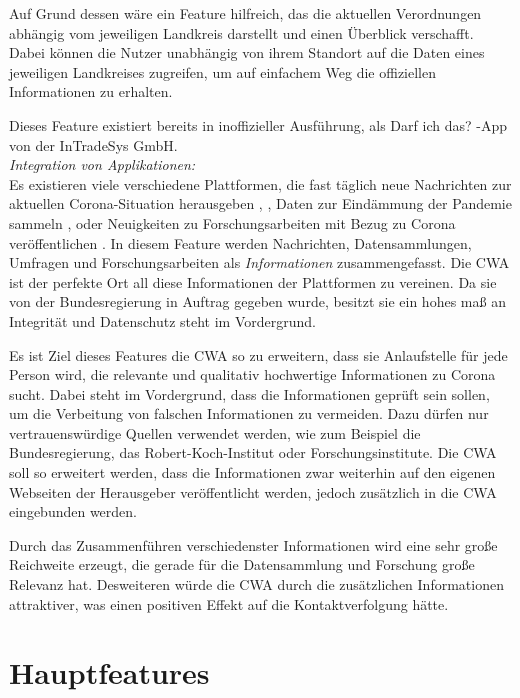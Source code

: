 \documentclass[conference]{IEEEtran}
\begin{document}
Auf Grund dessen wäre ein Feature hilfreich, das die aktuellen Verordnungen abhängig vom jeweiligen Landkreis darstellt und einen Überblick verschafft.
Dabei können die Nutzer unabhängig von ihrem Standort auf die Daten eines jeweiligen Landkreises zugreifen,
um auf einfachem Weg die offiziellen Informationen zu erhalten. 

Dieses Feature existiert bereits in inoffizieller Ausführung, als \glqq Darf ich das? \grqq{} -App von der InTradeSys GmbH. \cite{DarfIchDas}\\

\textit{Integration von Applikationen:}\\
Es existieren viele verschiedene Plattformen, die fast täglich neue Nachrichten zur aktuellen Corona-Situation herausgeben \cite{RKI}, \cite{BMG}, Daten zur Eindämmung der Pandemie sammeln \cite{RKIDatenspende}, \cite{Gedaechtnistest} oder Neuigkeiten zu Forschungsarbeiten mit Bezug zu Corona veröffentlichen \cite{GesundheitsforschungNews}.
In diesem Feature werden Nachrichten, Datensammlungen, Umfragen und Forschungsarbeiten als \textit{Informationen} zusammengefasst.
Die CWA ist der perfekte Ort all diese Informationen der Plattformen zu vereinen. 
Da sie von der Bundesregierung in Auftrag gegeben wurde, besitzt sie ein hohes maß an Integrität und Datenschutz steht im Vordergrund.

Es ist Ziel dieses Features die CWA so zu erweitern, dass sie Anlaufstelle für jede Person wird, die relevante und qualitativ hochwertige Informationen zu Corona sucht.
Dabei steht im Vordergrund, dass die Informationen geprüft sein sollen, um die Verbeitung von falschen Informationen zu vermeiden. 
Dazu dürfen nur vertrauenswürdige Quellen verwendet werden, wie zum Beispiel die Bundesregierung, das Robert-Koch-Institut oder Forschungsinstitute. 
Die CWA soll so erweitert werden, dass die Informationen zwar weiterhin auf den eigenen Webseiten der Herausgeber veröffentlicht werden, jedoch zusätzlich in die CWA eingebunden werden.

Durch das Zusammenführen verschiedenster Informationen wird eine sehr große Reichweite erzeugt, die gerade für die Datensammlung und Forschung große Relevanz hat.
Desweiteren würde die CWA durch die zusätzlichen Informationen attraktiver, was einen positiven Effekt auf die Kontaktverfolgung hätte.\\

\section{Hauptfeatures} \label{Hauptfeatures}
\end{document}
